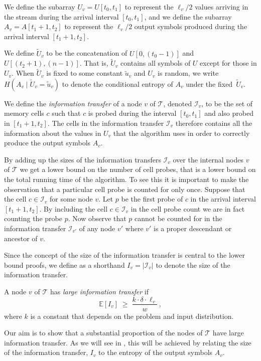 \documentclass{toc}
\newcommand{\calI}{\ensuremath{\mathcal{I}}}
\newcommand{\calT}{\ensuremath{\mathcal{T}}}
\newcommand{\expected}[1]{\ensuremath{\mathbb{E}[#1]}}
\newcommand{\lit}{large information transfer\xspace}
\newcommand{\Xv}{\ensuremath{U_v}}
\newcommand{\Xvknown}{\ensuremath{\widetilde{U}_v}}
\newcommand{\Xvfix}{\ensuremath{\widetilde{u}_v}}
\newcommand{\Yv}{\ensuremath{A_v}}
\newcommand{\vitset}{\ensuremath{\mathcal{I}_v}}
\newcommand{\vit}{\ensuremath{I_v}}
\begin{document}
We define the subarray $\Xv=U[t_0,t_1]$ to represent the $\ell_{v}/2$ values
arriving in the stream during the arrival interval $[t_{0},t_{1}]$, and we define the subarray $\Yv=A[t_{1}+1,t_{2}]$ to represent the $\ell_{v}/2$
output symbols produced during the arrival interval $[t_{1}+1,t_{2}]$.

We define $\Xvknown$ to be the concatenation of $U[0,(t_0-1)]$
and $U[(t_2+1),(n-1)]$. That is, $\Xvknown$ contains all symbols
of $U$ except for those in $\Xv$.
When $\Xvknown$ is fixed to some constant $\Xvfix$ and $\Xv$ is
random, we write $H(\Yv\mid\Xvknown=\Xvfix)$ to denote the conditional
entropy of $\Yv$ under the fixed~$\Xvknown$.

We define the \emph{information transfer} of a node $v$ of $\calT$,
denoted $\vitset$, to be the set of memory cells $c$ such that $c$
is probed during the interval $[t_{0},t_{1}]$ and also probed in $[t_{1}+1,t_{2}]$.
The cells in
the information transfer $\vitset$ therefore contains
all the information about the values in $\Xv$ that the algorithm
uses in order to correctly produce the output symbols $\Yv$.

By adding up the sizes of the information transfers $\vitset$ over the internal nodes $v$
of $\calT$ we get a lower bound on the number of cell probes, that is a lower bound on the total running time of the algorithm.
To see this it is important to make the observation
that a particular cell probe is counted for only once.
Suppose that the cell $c\in\vitset$ for some node $v$. Let $p$ be the first probe of $c$ in the arrival interval $[t_{1}+1,t_{2}]$. By including the cell $c\in\vitset$ in the cell probe count we are in fact counting the probe $p$. Now observe that $p$ cannot be counted for in the information transfer $\calI_{v'}$ of any node $v'$ where $v'$ is a proper descendant or ancestor of $v$.

Since the concept of the size of the information transfer is central to the lower bound proofs, we define as a shorthand $\vit=|\vitset|$ to denote the size of the information transfer.

\begin{definition}
	\label{def:large-it}
	A node $v$ of $\calT$ has \emph{\lit} if
	\[
	\expected{\vit} \;\geq\; \frac{k\cdot\delta\cdot\ell_v}{w}\,,
	\]
	where $k$ is a constant that depends on the problem and input distribution.
\end{definition}

Our aim is to show that a substantial proportion of the nodes of $\calT$ have \lit. As we will see in , this will be achieved by relating the size of the information transfer, $\vit$ to the entropy of the output symbols $\Yv$.
\end{document}
